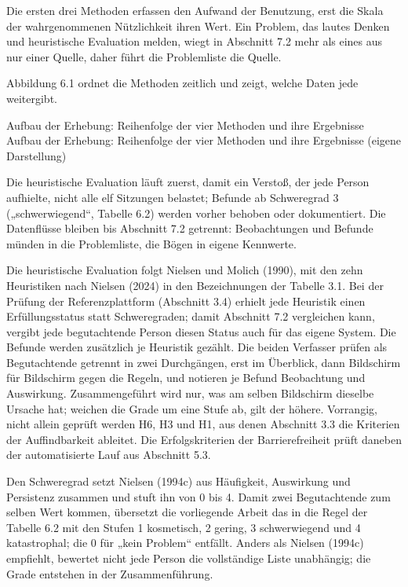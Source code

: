 Die ersten drei Methoden erfassen den Aufwand der Benutzung, erst die Skala der wahrgenommenen Nützlichkeit ihren Wert. Ein Problem, das lautes Denken und heuristische Evaluation melden, wiegt in Abschnitt 7.2 mehr als eines aus nur einer Quelle, daher führt die Problemliste die Quelle.

Abbildung 6.1 ordnet die Methoden zeitlich und zeigt, welche Daten jede weitergibt.

%
{Aufbau der Erhebung: Reihenfolge der vier Methoden und ihre Ergebnisse}%
{Aufbau der Erhebung: Reihenfolge der vier Methoden und ihre Ergebnisse (eigene Darstellung)}

Die heuristische Evaluation läuft zuerst, damit ein Verstoß, der jede Person aufhielte, nicht alle elf Sitzungen belastet; Befunde ab Schweregrad 3 („schwerwiegend“, Tabelle 6.2) werden vorher behoben oder dokumentiert. Die Datenflüsse bleiben bis Abschnitt 7.2 getrennt: Beobachtungen und Befunde münden in die Problemliste, die Bögen in eigene Kennwerte.

Die heuristische Evaluation folgt Nielsen und Molich (1990), mit den zehn Heuristiken nach Nielsen (2024) in den Bezeichnungen der Tabelle 3.1. Bei der Prüfung der Referenzplattform (Abschnitt 3.4) erhielt jede Heuristik einen Erfüllungsstatus statt Schweregraden; damit Abschnitt 7.2 vergleichen kann, vergibt jede begutachtende Person diesen Status auch für das eigene System. Die Befunde werden zusätzlich je Heuristik gezählt. Die beiden Verfasser prüfen als Begutachtende getrennt in zwei Durchgängen, erst im Überblick, dann Bildschirm für Bildschirm gegen die Regeln, und notieren je Befund Beobachtung und Auswirkung. Zusammengeführt wird nur, was am selben Bildschirm dieselbe Ursache hat; weichen die Grade um eine Stufe ab, gilt der höhere. Vorrangig, nicht allein geprüft werden H6, H3 und H1, aus denen Abschnitt 3.3 die Kriterien der Auffindbarkeit ableitet. Die Erfolgskriterien der Barrierefreiheit prüft daneben der automatisierte Lauf aus Abschnitt 5.3.

Den Schweregrad setzt Nielsen (1994c) aus Häufigkeit, Auswirkung und Persistenz zusammen und stuft ihn von 0 bis 4. Damit zwei Begutachtende zum selben Wert kommen, übersetzt die vorliegende Arbeit das in die Regel der Tabelle 6.2 mit den Stufen 1 kosmetisch, 2 gering, 3 schwerwiegend und 4 katastrophal; die 0 für „kein Problem“ entfällt. Anders als Nielsen (1994c) empfiehlt, bewertet nicht jede Person die vollständige Liste unabhängig; die Grade entstehen in der Zusammenführung.


